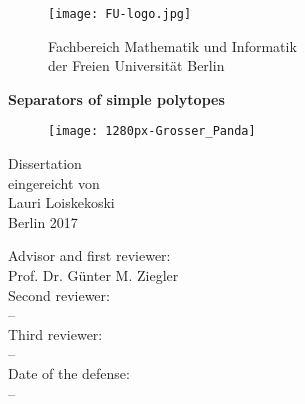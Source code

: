 \documentclass[a4paper,12pt]{book}
\theoremstyle{plain}
\theoremstyle{definition}
\begin{document}
\begin{titlepage}
\begin{center}
\begin{figure}[h]
\begin{minipage}{.35\textwidth}
\begin{center}
\texttt{[image: FU-logo.jpg]}
\end{center}
\end{minipage}
\begin{minipage}{.64\textwidth}
\large {Fachbereich Mathematik und Informatik\\
der Freien Universit\"at Berlin}
\end{minipage}
\end{figure}

\vspace{1.5cm}
\LARGE{\bf{
Separators of simple polytopes}}\\

\vspace{1cm}
\begin{figure}[h]
\begin{center}

\texttt{[image: 1280px-Grosser\_Panda]}

\end{center}
\end{figure}
\vspace{0.5cm}
\LARGE{
{Dissertation}\\}
\large
\vspace{1cm}
eingereicht von\\
Lauri Loiskekoski\\
\vspace{1.5cm}
Berlin 2017\\
\vspace{3cm}
\end{center}
\end{titlepage}

\cleardoublepage\thispagestyle{empty}

\null\vfill
\begin{center}
\large{Advisor and first reviewer:\\
Prof. Dr. Günter M. Ziegler}\\
\vspace{0.2cm}
Second reviewer:\\
--\\
\vspace{0.2cm}
Third reviewer:\\
--\\
\vspace{0.6cm}
Date of the defense:\\
--
\end{center}
\end{document}
